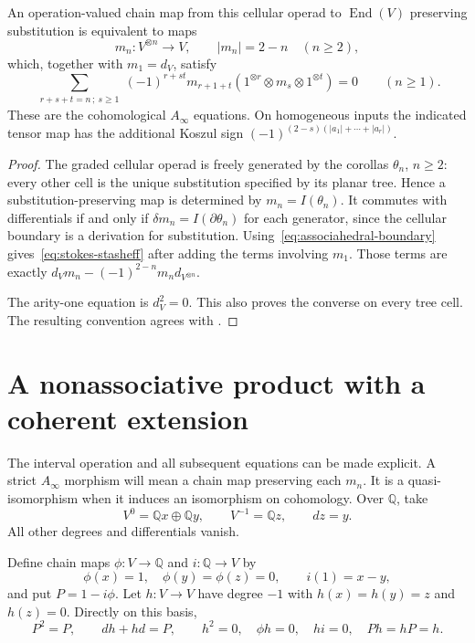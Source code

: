 \begin{proposition}
\label{prop:associahedral-operations}
An operation-valued chain map from this cellular operad to
$\operatorname{End}(V)$ preserving substitution is equivalent to maps
\[
 m_n:V^{\otimes n}\longrightarrow V,
 \qquad |m_n|=2-n\quad(n\ge2),
\]
which, together with $m_1=d_V$, satisfy
\begin{equation}\label{eq:stokes-stasheff}
 \sum_{\substack{r+s+t=n\,;\ s\ge1}}
 (-1)^{r+st}
 m_{r+1+t}(1^{\otimes r}\otimes m_s\otimes1^{\otimes t})=0
 \qquad(n\ge1).
\end{equation}
These are the cohomological $A_\infty$ equations.
On homogeneous inputs the indicated tensor map has the additional
Koszul sign $(-1)^{(2-s)(|a_1|+\cdots+|a_r|)}$.
\end{proposition}
\begin{proof}
The graded cellular operad is freely generated by the corollas
$\theta_n$, $n\ge2$: every other cell is the unique substitution
specified by its planar tree.
Hence a substitution-preserving map is determined by
$m_n=I(\theta_n)$.
It commutes with differentials if and only if
$\delta m_n=I(\partial\theta_n)$ for each generator,
since the cellular boundary is a derivation for substitution.
Using~\eqref{eq:associahedral-boundary} gives~\eqref{eq:stokes-stasheff}
after adding the terms involving $m_1$.
Those terms are exactly
$d_Vm_n-(-1)^{2-n}m_n d_{V^{\otimes n}}$.

The arity-one equation is $d_V^2=0$.
This also proves the converse on every tree cell.
The resulting convention agrees with \cite[\S3.1]{KellerAInfinity2001}.
\end{proof}

\section{A nonassociative product with a coherent extension}
The interval operation and all subsequent equations can be made explicit.
A strict $A_\infty$ morphism will mean a chain map preserving each $m_n$.
It is a quasi-isomorphism when it induces an isomorphism on cohomology.
Over $\mathbb Q$, take
\[
 V^0=\mathbb Qx\oplus\mathbb Qy,\qquad
 V^{-1}=\mathbb Qz,\qquad dz=y.
\]
All other degrees and differentials vanish.

Define chain maps $\phi:V\to\mathbb Q$ and $i:\mathbb Q\to V$ by
\[
 \phi(x)=1,\quad\phi(y)=\phi(z)=0,\qquad i(1)=x-y,
\]
and put $P=1-i\phi$.
Let $h:V\to V$ have degree $-1$ with
$h(x)=h(y)=z$ and $h(z)=0$.
Directly on this basis,
\[
 P^2=P,\qquad dh+hd=P,\qquad
 h^2=0,\quad\phi h=0,\quad hi=0,\quad Ph=hP=h.
\]

